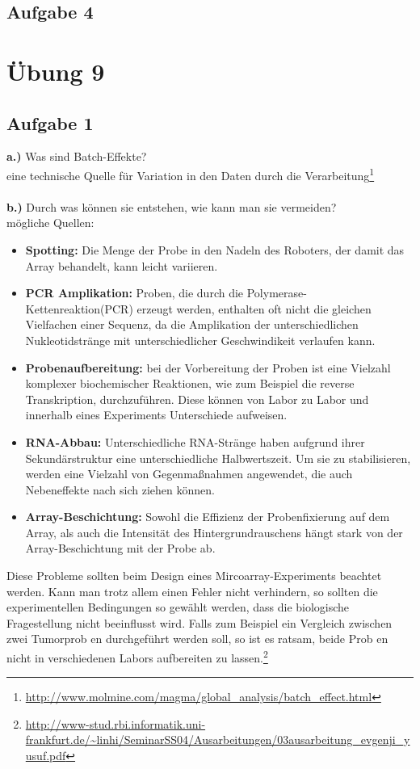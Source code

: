 \documentclass[13pt,a4paper]{article}
\begin{document}
\subsection{Aufgabe 4}

\newpage
\section{Übung 9}
\subsection{Aufgabe 1}
\textbf{a.)} Was sind Batch-Effekte?\\
eine technische Quelle für Variation in den Daten durch die Verarbeitung\footnote{\url{http://www.molmine.com/magma/global_analysis/batch_effect.html}}
\\\\
\textbf{b.)} Durch was können sie entstehen, wie kann man sie vermeiden?\\
mögliche Quellen:
\begin{itemize}
	\item \textbf{Spotting:} Die Menge der Probe in den Nadeln des Roboters, der damit das Array behandelt, kann leicht variieren.
	\item \textbf{PCR Amplikation:} Proben, die durch die Polymerase-Kettenreaktion(PCR) erzeugt werden, enthalten oft nicht die gleichen Vielfachen einer Sequenz, da die Amplikation der unterschiedlichen Nukleotidstränge mit unterschiedlicher Geschwindikeit verlaufen kann.
	\item \textbf{Probenaufbereitung:} bei der Vorbereitung der Proben ist eine Vielzahl komplexer biochemischer Reaktionen, wie zum Beispiel die reverse Transkription, durchzuführen. Diese können von Labor zu Labor und innerhalb eines Experiments Unterschiede aufweisen.
	\item \textbf{RNA-Abbau:} Unterschiedliche RNA-Stränge haben aufgrund ihrer Sekundärstruktur eine unterschiedliche Halbwertszeit. Um sie zu stabilisieren, werden eine Vielzahl von Gegenmaßnahmen angewendet, die auch Nebeneffekte nach sich ziehen können.
	\item \textbf{Array-Beschichtung:} Sowohl die Effizienz der Probenfixierung auf dem Array, als auch die Intensität des Hintergrundrauschens hängt stark von der Array-Beschichtung mit der Probe ab.
\end{itemize}
Diese Probleme sollten beim Design eines Mircoarray-Experiments beachtet werden. Kann man trotz allem einen Fehler nicht verhindern, so sollten die experimentellen Bedingungen so gewählt werden, dass die biologische Fragestellung nicht beeinflusst wird. Falls zum Beispiel ein Vergleich zwischen zwei Tumorprob en durchgeführt werden soll, so ist es ratsam, beide Prob en nicht in verschiedenen Labors aufbereiten zu lassen.\footnote{\url{http://www-stud.rbi.informatik.uni-frankfurt.de/~linhi/SeminarSS04/Ausarbeitungen/03ausarbeitung_evgenji_yusuf.pdf}}
\end{document}
